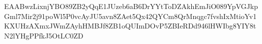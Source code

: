 EAABwzLixnjYBO89ZB2yQqE1JUzeb6aB6DrYYtToDZAkhEmJiO089YpVGJkpGml7Mir2j91poWl5P0vcAyJU5avn8ZAet5Qx42QYCm8QrMnqgc7fvshIxMtioYv1KXUHzAXmxJWmZAyhHMBJf8ZB1oQUImDOvP5ZBIeRDd946lHWIbg8YIY8tN2lYHgPPfkJ5OtLC0ZD
